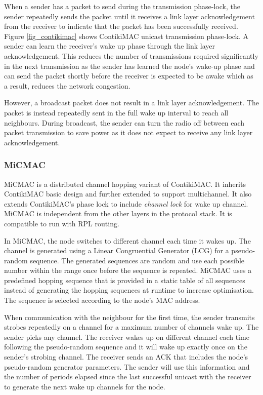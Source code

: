 When a sender has a packet to send during the transmission phase-lock, the sender repeatedly sends the packet until it receives a link layer acknowledgement from the receiver to indicate that the packet has been successfully received. Figure \ref{fig_contikimac} shows ContikiMAC unicast transmission phase-lock. A sender can learn the receiver's wake up phase through the link layer acknowledgement. This reduces the number of transmissions required significantly in the next transmission as the sender has learned the node's wake-up phase and can send the packet shortly before the receiver is expected to be awake which as a result, reduces the network congestion.

However, a broadcast packet does not result in a link layer acknowledgement. The packet is instead repeatedly sent in the full wake up interval to reach all neighbours. During broadcast, the sender can turn the radio off between each packet transmission to save power as it does not expect to receive any link layer acknowledgement.



\subsubsection{MiCMAC}
MiCMAC \cite{micmac} is a distributed channel hopping variant of ContikiMAC. It inherits ContikiMAC basic design and further extended to support multichannel. It also extends ContikiMAC's phase lock to include \textit{channel lock} for wake up channel. MiCMAC is independent from the other layers in the protocol stack. It is compatible to run with RPL routing.

In MiCMAC, the node switches to different channel each time it wakes up. The channel is generated using a Linear Congruential Generator (LCG) for a pseudo-random sequence. The generated sequences are random and use each possible number within the range once before the sequence is repeated. MiCMAC uses a predefined hopping sequence that is provided in a static table of all sequences instead of generating the hopping sequences at runtime to increase optimisation. The sequence is selected according to the node's MAC address.

When communication with the neighbour for the first time, the sender transmits strobes repeatedly on a channel for a maximum number of channels wake up. The sender picks any channel. The receiver wakes up on different channel each time following the pseudo-random sequence and it will wake up exactly once on the sender's strobing channel. The receiver sends an ACK that includes the node's pseudo-random generator parameters. The sender will use this information and the number of periods elapsed since the last successful unicast with the receiver to generate the next wake up channels for the node.

